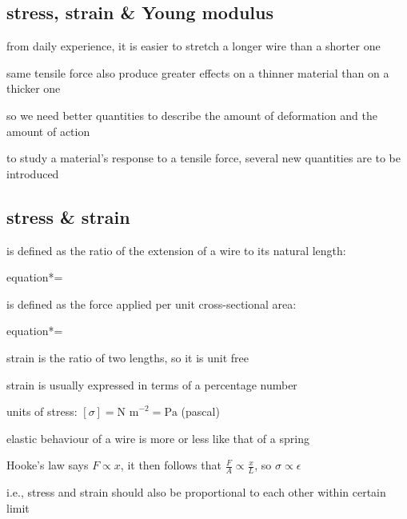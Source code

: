 \subsection{stress, strain \& Young modulus}

from daily experience, it is easier to stretch a longer wire than a shorter one

same tensile force also produce greater effects on a thinner material than on a thicker one

so we need better quantities to describe the amount of deformation and the amount of action

to study a material's response to a tensile force, several new quantities are to be introduced

\subsection{stress \& strain}

\begin{ilight}
	\centering {} is defined as the ratio of the extension of a wire to its natural length: \begin{empheq}[box=\tcbhighmath]{equation*}{\epsilon = }	\end{empheq}
\end{ilight}

\begin{ilight}
	\centering {} is defined as the force applied per unit cross-sectional area: 
	    \begin{empheq}[box=\tcbhighmath]{equation*}{\sigma = }\end{empheq}
\end{ilight}

\cmt strain is the ratio of two lengths, so it is unit free

strain is usually expressed in terms of a percentage number

\cmt units of stress: $[\sigma] = \text{N m}^{-2} = \text{Pa}$ (pascal)

\cmt elastic behaviour of a wire is more or less like that of a spring

Hooke's law says $F \propto x$, it then follows that $\frac{F}{A} \propto \frac{x}{L}$, so $\sigma \propto \epsilon$

i.e., stress and strain should also be proportional to each other within certain limit


